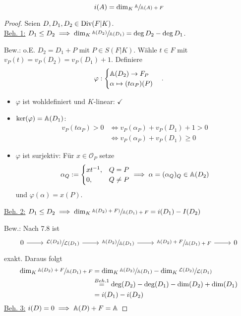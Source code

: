 \begin{satz}
    $$ i(A) = \dim_K \sfrac{\mathbb{A}}{\mathbb{A}(A)+F}$$
\end{satz}
\begin{proof}
    Seien $D,D_1,D_2 \in \operatorname{Div}(F|K)$.\\
    \underline{Beh. 1:} $D_1 \leq D_2 \implies \dim_K \sfrac{\mathbb{A}(D_2)}{\mathbb{A}(D_1)} = \deg D_2 - \deg D_1$.

    Bew.: o.E. $D_2 = D_1 + P$ mit $P \in S(F|K)$. Wähle $t \in F$ mit $v_P(t) = v_P(D_2) = v_P(D_1) + 1$.
    Definiere $$ \varphi : \begin{cases}
        \mathbb{A}(D_2) \to F_P\\
        \alpha \mapsto (t\alpha_P)(P)
    \end{cases}.$$
    \begin{itemize}
        \item $\varphi$ ist wohldefiniert und $K$-linear: $\checkmark$
        \item $\ker(\varphi) = \mathbb{A}(D_1)$:
        \begin{align*}
            v_P(t \alpha_P) > 0 & \iff v_P(\alpha_P) + v_P(D_1) + 1 > 0\\
            &\iff v_P(\alpha_P) + v_P(D_1) \geq 0
        \end{align*}
        \item $\varphi$ ist surjektiv: Für $x \in \mathcal{O}_P$ setze
        $$ \alpha_Q := \begin{cases}
            xt^{-1}, & Q=P\\
            0, & Q \ne P
        \end{cases} \implies \alpha = (\alpha_Q)_Q \in \mathbb{A}(D_2)$$
        und $ \varphi(\alpha) = x(P)$.
    \end{itemize}
    \underline{Beh. 2:} $D_1 \leq D_2 \implies \dim_K \sfrac{\mathbb{A}(D_2) + F)}{\mathbb{A}(D_1) + F} = i(D_1) - I(D_2)$

    Bew.: Nach 7.8 ist
    $$\begin{tikzcd}
        0 \ar[r] &\sfrac{\mathcal{L}(D_2)}{\mathcal{L}(D_1)} \ar[r] &\sfrac{\A(D_2)}{\A(D_1)} \ar[r] &\sfrac{\A(D_2)+F}{\A(D_1)+F} \ar[r] &0 
    \end{tikzcd}$$
    exakt. Daraus folgt
    \begin{align*}
        \dim_K \sfrac{\mathbb{A}(D_2)+F}{\mathbb{A}(D_1)+F} &= \dim_K \sfrac{\mathbb{A}(D_2)}{\mathbb{A}(D_1)} - \dim_K \sfrac{\mathcal{L}(D_2)}{\mathcal{L}(D_1)}\\
        &\stackrel{Beh. 1}{=} \deg(D_2) - \deg(D_1) - \dim(D_2) + \dim(D_1)\\
        &=i(D_1) - i(D_2)
    \end{align*}
    \underline{Beh. 3:} $i(D) = 0 \implies \mathbb{A}(D) + F = \mathbb{A}$


\end{proof}
